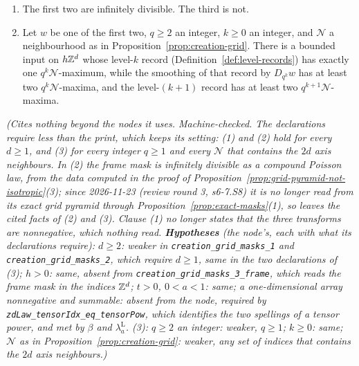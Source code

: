 \begin{proposition}
\begin{enumerate}
\item The first two are infinitely divisible. The third is not.
\item Let $w$ be one of the first two, $q \ge 2$ an integer, $k \ge 0$ an integer, and
$\mathcal{N}$ a neighbourhood as in Proposition~\ref{prop:creation-grid}. There is a bounded input
on $h\mathbb{Z}^d$ whose level-$k$ record (Definition~\ref{def:level-records}) has exactly one $q^k\mathcal{N}$-maximum, while the smoothing of
that record by $D_{q^k}w$ has at least two $q^k\mathcal{N}$-maxima, and the level-$(k+1)$ record
has at least two $q^{k+1}\mathcal{N}$-maxima.
\end{enumerate}
\statusT\quad\emph{(Cites nothing beyond the nodes it uses. Machine-checked. The declarations require
less than the print, which keeps its setting: (1) and (2) hold for every $d \ge 1$, and (3) for
every integer $q \ge 1$ and every $\mathcal{N}$ that contains the $2d$ axis neighbours. In (2) the
frame mask is infinitely divisible as a compound Poisson law, from the data computed in the proof of
Proposition~\ref{prop:grid-pyramid-not-isotropic}(3); since 2026-11-23 (review round 3, s6-7.S8)
it is no longer read from its exact grid pyramid through Proposition~\ref{prop:exact-masks}(1), so
 leaves the cited facts of (2) and (3). Clause (1) no longer states that the three
transforms are nonnegative, which nothing read.
\textbf{Hypotheses} (the node's, each with what its declarations require): $d \ge 2$: weaker in
\texttt{creation\_grid\_masks\_1} and \texttt{creation\_grid\_masks\_2}, which require $d \ge 1$, same in
the two declarations of (3); $h > 0$: same, absent from \texttt{creation\_grid\_masks\_3\_frame},
which reads the frame mask in the indices $\mathbb{Z}^d$; $t > 0$, $0 < a < 1$: same; a one-dimensional
array nonnegative and summable: absent from the node, required by
\texttt{zdLaw\_tensorIdx\_eq\_tensorPow}, which identifies the two spellings of a tensor power, and
met by $\beta$ and $\lambda^{\mathrm L}_a$. (3): $q \ge 2$ an integer: weaker, $q \ge 1$; $k \ge 0$:
same; $\mathcal{N}$ as in Proposition~\ref{prop:creation-grid}: weaker, any set of indices that
contains the $2d$ axis neighbours.)}
\end{proposition}

